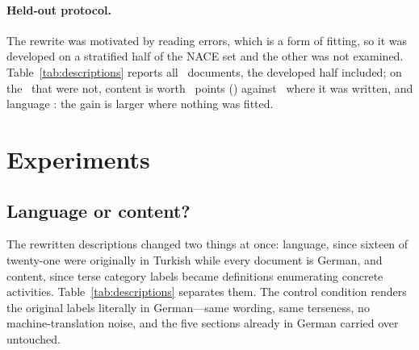 \documentclass[11pt]{article}
\begin{document}
\paragraph{Held-out protocol.}
The rewrite was motivated by reading errors, which is a form of fitting, so it
was developed on a stratified half of the NACE set and the other was not
examined. Table~\ref{tab:descriptions} reports all \NEVAL\ documents, the
developed half included; on the \HeldOutN\ that were not, content is worth
\HeldOutContentEffect~points (\HeldOutContentPStat) against
\DevContentEffect\ where it was written, and language
\HeldOutLanguageEffect: the gain is larger where nothing was fitted.

\section{Experiments}

\subsection{Language or content?}
\label{sec:descriptions}



The rewritten descriptions changed two things at once: language, since sixteen
of twenty-one were originally in Turkish while every document is German, and
content, since terse category labels became definitions enumerating concrete
activities. Table~\ref{tab:descriptions} separates them. The control condition
renders the original labels literally in German---same wording, same terseness, no
machine-translation noise, and the five sections already in German carried over
untouched.
\end{document}
